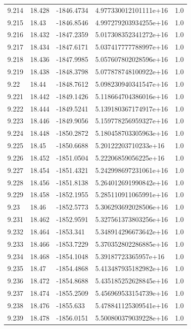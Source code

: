 \begin{tabular}{lllll}
9.214 & 18.428 & -1846.4734 & 4.977330012101111e+16 & 1.0 \\
9.215 & 18.43 & -1846.8546 & 4.997279203934255e+16 & 1.0 \\
9.216 & 18.432 & -1847.2359 & 5.017308352341272e+16 & 1.0 \\
9.217 & 18.434 & -1847.6171 & 5.037417777788997e+16 & 1.0 \\
9.218 & 18.436 & -1847.9985 & 5.057607802028596e+16 & 1.0 \\
9.219 & 18.438 & -1848.3798 & 5.077878748100922e+16 & 1.0 \\
9.22 & 18.44 & -1848.7612 & 5.098230940341547e+16 & 1.0 \\
9.221 & 18.442 & -1849.1426 & 5.118664704386016e+16 & 1.0 \\
9.222 & 18.444 & -1849.5241 & 5.139180367174917e+16 & 1.0 \\
9.223 & 18.446 & -1849.9056 & 5.159778256959327e+16 & 1.0 \\
9.224 & 18.448 & -1850.2872 & 5.180458703305963e+16 & 1.0 \\
9.225 & 18.45 & -1850.6688 & 5.20122203710233e+16 & 1.0 \\
9.226 & 18.452 & -1851.0504 & 5.22206859056225e+16 & 1.0 \\
9.227 & 18.454 & -1851.4321 & 5.242998697231061e+16 & 1.0 \\
9.228 & 18.456 & -1851.8138 & 5.264012691990842e+16 & 1.0 \\
9.229 & 18.458 & -1852.1955 & 5.285110911065991e+16 & 1.0 \\
9.23 & 18.46 & -1852.5773 & 5.306293692028506e+16 & 1.0 \\
9.231 & 18.462 & -1852.9591 & 5.327561373803256e+16 & 1.0 \\
9.232 & 18.464 & -1853.341 & 5.348914296673642e+16 & 1.0 \\
9.233 & 18.466 & -1853.7229 & 5.370352802286885e+16 & 1.0 \\
9.234 & 18.468 & -1854.1048 & 5.39187723365957e+16 & 1.0 \\
9.235 & 18.47 & -1854.4868 & 5.413487935182982e+16 & 1.0 \\
9.236 & 18.472 & -1854.8688 & 5.435185252628845e+16 & 1.0 \\
9.237 & 18.474 & -1855.2509 & 5.456969533154739e+16 & 1.0 \\
9.238 & 18.476 & -1855.633 & 5.478841125309541e+16 & 1.0 \\
9.239 & 18.478 & -1856.0151 & 5.500800379039228e+16 & 1.0 \\

\end{tabular}
